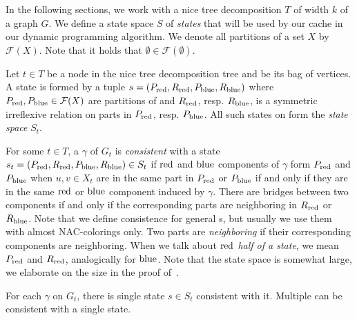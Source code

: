 In the following sections,
we work with a nice tree decomposition \( T \) of width \( k \)
of a graph \( G \).
%
We define a state space \( S \) of \emph{states}
that will be used by our cache in our dynamic programming algorithm.
We denote all partitions of a set \( X \) by \( \mathcal{F}(X) \).
Note that it holds that \( \emptyset \in \mathcal{F}(\emptyset) \).

%
\begin{definition}
	Let \( t \in T \) be a node in the nice tree decomposition tree and
	\Xt{} be its bag of vertices.
	A state is formed by a tuple \( s = (P_{\text{red}}, R_{\text{red}}, P_{\text{blue}}, R_{\text{blue}}) \)
	where \( P_{\text{red}}, P_{\text{blue}} \in \mathcal{F}(X)\) are partitions of \Xt{}
	and \( R_{\text{red}}\), resp. \(R_{\text{blue}} \), is a symmetric irreflexive relation
	on parts in \( P_{\text{red}}\), resp. \(P_{\text{blue}} \).
	All such states on \Xt{} form the \emph{state space} \( S_t \).
\end{definition}
%
For some \( t \in T \), a \rbcol{} \( \gamma \) of \( G_t \)
is \emph{consistent} with a state \( s_t = (P_{\text{red}}, R_{\text{red}}, P_{\text{blue}}, R_{\text{blue}}) \in S_t \)
if \( \text{red} \) and \( \text{blue} \) components of \( \gamma \) form \( P_{\text{red}} \) and \( P_{\text{blue}} \)
when \( u, v \in X_t \) are in the same part in \( P_{\text{red}} \) or \( P_{\text{blue}} \)
if and only if they are in the same \( \text{red} \) or \( \text{blue} \) component induced by \( \gamma \).
There are bridges between two components if and only if
the corresponding parts are neighboring in \( R_{\text{red}} \) or \( R_{\text{blue}} \).
%
Note that we define consistence for general \rbcol{}s,
but usually we use them with almost NAC-colorings only.
%
Two parts are \emph{neighboring} if their corresponding components are neighboring.
When we talk about \emph{\( \text{red} \) half of a state},
we mean \( P_{\text{red}} \) and \( R_{\text{red}} \),
analogically for \( \text{blue} \).
%
Note that the state space is somewhat large,
we elaborate on the size in the proof of~.
%
\begin{observation}
	For each \rbcol{} \( \gamma \) on \( G_t \),
	there is single state \( s \in S_t \) consistent with it.
	Multiple \rbcol{} can be consistent with a single state.
\end{observation}
%

